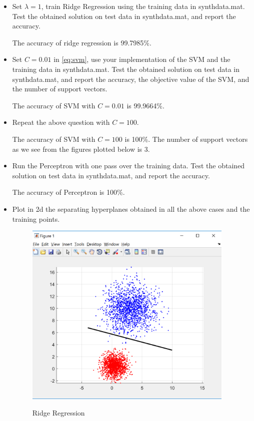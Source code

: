 \documentclass{article}
\begin{document}
\begin{itemize}
\item Set $\lambda=1$, train Ridge Regression using the training data in synthdata.mat. Test the obtained solution on test data in synthdata.mat, and report the accuracy. 
\begin{mdframed}[backgroundcolor=lightgray]
The accuracy of ridge regression is 99.7985\%.
\end{mdframed}

\item Set $C=0.01$ in \eqref{eq:svm}, use your implementation of the SVM and the training data in synthdata.mat. Test the obtained solution on test data in synthdata.mat, and report the accuracy, the objective value of the SVM, and the number of support vectors. 
\begin{mdframed}[backgroundcolor=lightgray]
The accuracy of SVM with $C=0.01$ is 99.9664\%.
\end{mdframed}

\item Repeat the above question with $C = 100.$
\begin{mdframed}[backgroundcolor=lightgray]
The accuracy of SVM with $C = 100$ is 100\%. The number of support vectors as we see from the figures plotted below is 3.
\end{mdframed}

\item Run the Perceptron with one pass over the training data. Test the obtained solution on test data in synthdata.mat, and report the accuracy. \begin{mdframed}[backgroundcolor=lightgray]
The accuracy of Perceptron is 100\%.
\end{mdframed}

\item Plot in 2d the separating hyperplanes obtained in all the above cases and the training points. \\

\begin{center}
\begin{figure}
\caption{Ridge Regression}
\includegraphics[width=100mm,scale=0.3]{ridge}\\
\end{figure}


\end{center}
\end{itemize}
\end{document}
